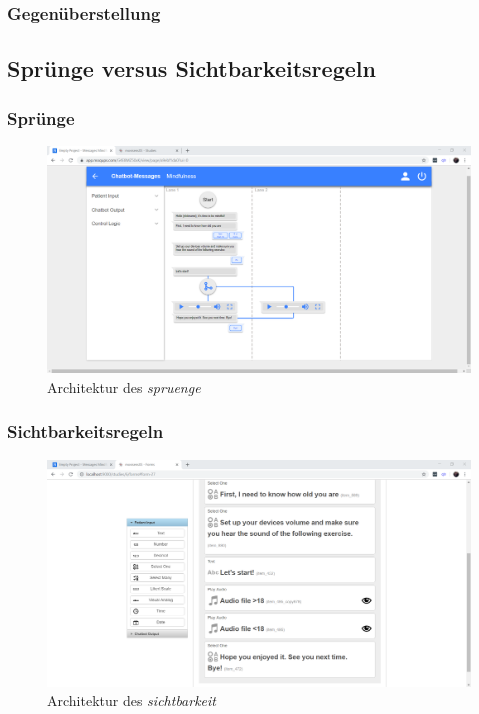 \subsubsection{Gegenüberstellung}


\subsection{Sprünge versus Sichtbarkeitsregeln}

\subsubsection{Sprünge}

\begin{figure}[h]
\centering
\includegraphics[width=1\textwidth]{pictures/spruenge}
\caption{Architektur des \emph{spruenge}}
\label{spruenge}
\end{figure}


\subsubsection{Sichtbarkeitsregeln}

\begin{figure}[h]
\centering
\includegraphics[width=1\textwidth]{pictures/sichtbarkeit}
\caption{Architektur des \emph{sichtbarkeit}}
\label{sichtbarkeit}
\end{figure}



